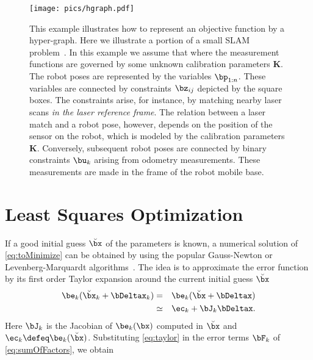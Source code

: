 \documentclass[a4paper]{article}
\begin{document}
\begin{figure}
\centering
{}
\texttt{[image: pics/hgraph.pdf]}
\caption{This example illustrates how to represent an objective
  function by a hyper-graph. Here we illustrate a portion of a small
  SLAM problem~\cite{konolige10iros}. In this example we assume that
  where the measurement functions are governed by some unknown
  calibration parameters $\mathbf{K}$. The robot poses are represented
  by the variables $\bp_{1:n}$. These variables are connected by
  constraints $\bz_{ij}$ depicted by the square boxes. The constraints
  arise, for instance, by matching nearby laser scans \emph{in the
    laser reference frame}. The relation between a laser match and a
  robot pose, however, depends on the position of the sensor on the
  robot, which is modeled by the calibration parameters
  $\mathbf{K}$. Conversely, subsequent robot poses are connected by
  binary constraints $\bu_{k}$ arising from odometry
  measurements. These measurements are made in the frame of the robot
  mobile base.}
\label{fig:graph-example}
\end{figure}

\section{Least Squares Optimization}
If a good initial guess $\breve{\bx}$ of the parameters is known, a
numerical solution of \eqref{eq:toMinimize} can be obtained by using
the popular Gauss-Newton or Levenberg-Marquardt
algorithms~\cite[\S15.5]{Press92Book}.  The idea is to approximate the
error function by its first order Taylor expansion around the current
initial guess $\breve{\bx}$
\begin{eqnarray}
\be_{k}(\breve{\bx}_k + \bDeltax_k) &=& \be_{k}(\breve{\bx} + \bDeltax)\\
&\simeq& \ec_{k} + \bJ_{k} \bDeltax.
\label{eq:taylor}
\end{eqnarray}
Here $\bJ_{k}$ is the Jacobian of $\be_{k}(\bx)$ computed in
$\breve{\bx}$ and $\ec_{k} \defeq \be_{k}(\breve{\bx})$.
Substituting \eqref{eq:taylor} in the error terms $\bF_{k}$ of
\eqref{eq:sumOfFactors}, we obtain
\end{document}

